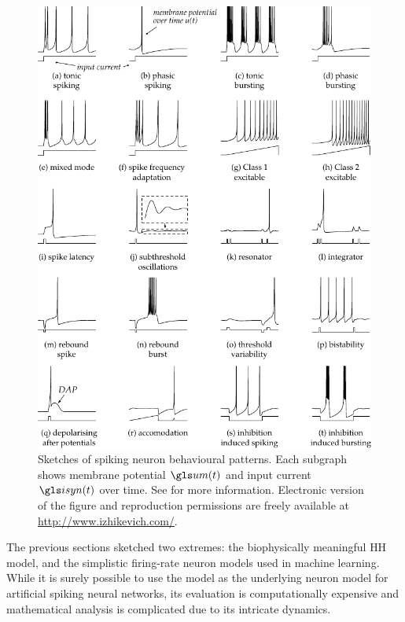 \begin{figure}[t]
	\centering
	\includegraphics{media/chp2/izhikevich_whichmod_figure1.pdf}
	\caption[Sketches of spiking neuron behavioural patterns]{Sketches of spiking neuron behavioural patterns. Each subgraph shows membrane potential $\um(t)$ and input current $\isyn(t)$ over time. See \cite{izhikevich2004model} for more information. Electronic version of the figure and reproduction permissions are freely available at \url{http://www.izhikevich.com/}.}
	\label{fig:neuron_behaviours}
\end{figure}

The previous sections sketched two extremes: the biophysically meaningful \acrfull{HH} model, and the simplistic firing-rate neuron models used in machine learning. While it is surely possible to use the \HH model as the underlying neuron model for artificial spiking neural networks, its evaluation is computationally expensive \cite{izhikevich2004model} and mathematical analysis is complicated due to its intricate dynamics.


